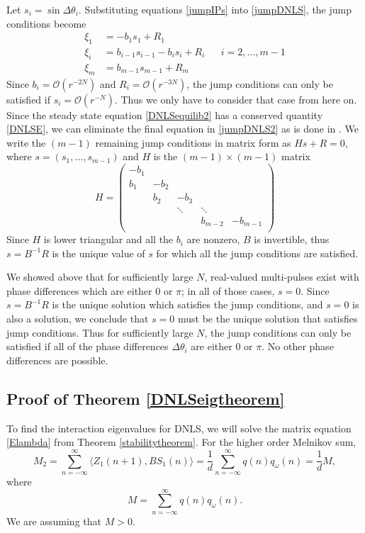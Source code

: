 \documentclass[12pt]{elsarticle}
\begin{document}
Let $s_i = \sin{\Delta\theta_i}$. Substituting equations \eqref{jumpIPs} into \eqref{jumpDNLS}, the jump conditions become
\begin{equation}\label{jumpDNLS2}
\begin{aligned}
\xi_1 &= -b_1 s_1 + R_1 \\
\xi_i &= b_{i-1} s_{i-1} - b_i s_i + R_i
&& i = 2, \dots, m-1 \\
\xi_m &= b_{m-1} s_{m-1} + R_m
\end{aligned}
\end{equation}
Since $b_i = \mathcal{O}(r^{-2N})$ and $R_i = \mathcal{O}(r^{-3N})$, the jump conditions can only be satisfied if $s_i = \mathcal{O}(r^{-N})$. Thus we only have to consider that case from here on. Since the steady state equation \eqref{DNLSequilib2} has a conserved quantity \eqref{DNLSE}, we can eliminate the final equation in \eqref{jumpDNLS2} as is done in \cite{SandstedeStrut}. We write the $(m-1)$ remaining jump conditions in matrix form as $H s + R = 0$, where $s = (s_1, \dots, s_{m-1})$ and $H$ is the $(m-1)\times(m-1)$ matrix
\[
H = \begin{pmatrix}
-b_1 \\
b_1 & -b_2 \\
& b_2 & -b_3 \\
&& \ddots & \ddots \\
&&& b_{m-2} & -b_{m-1} \\
\end{pmatrix}
\]
Since $H$ is lower triangular and all the $b_i$ are nonzero, $B$ is invertible, thus $s = B^{-1}R$ is the unique value of $s$ for which all the jump conditions are satisfied. 

We showed above that for sufficiently large $N$, real-valued multi-pulses exist with phase differences which are either 0 or $\pi$; in all of those cases, $s = 0$. Since $s = B^{-1}R$ is the unique solution which satisfies the jump conditions, and $s = 0$ is also a solution, we conclude that $s = 0$ must be the unique solution that satisfies jump conditions. Thus for sufficiently large $N$, the jump conditions can only be satisfied if all of the phase differences $\Delta \theta_i$ are either 0 or $\pi$. No other phase differences are possible.

\subsection{Proof of Theorem \ref{DNLSeigtheorem}}

To find the interaction eigenvalues for DNLS, we will solve the matrix equation \eqref{Elambda} from Theorem \ref{stabilitytheorem}. For the higher order Melnikov sum,
\[
M_2 = \sum_{n=-\infty}^\infty \langle Z_1(n+1), B S_1(n) \rangle =
\frac{1}{d} \sum_{n=-\infty}^\infty q(n) q_\omega(n) = \frac{1}{d}M,
\]
where
\[
M = \sum_{n=-\infty}^\infty q(n) q_\omega(n).
\]
We are assuming that $M > 0$. 
\end{document}
